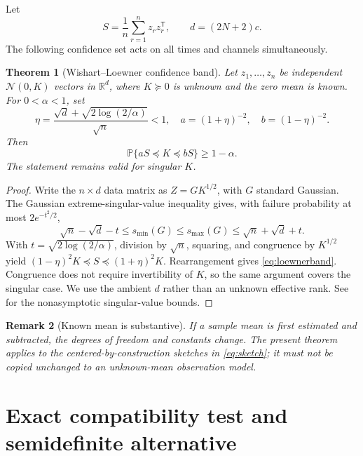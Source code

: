 \documentclass[11pt]{article}
\newtheorem{theorem}{Theorem}
\newtheorem{remark}[theorem]{Remark}
\begin{document}
Let
\begin{equation}
  S=\frac1n\sum_{r=1}^n z_rz_r^{\mathsf T},\qquad
  d=(2N+2)c.
\end{equation}
The following confidence set acts on all times and channels simultaneously.

\begin{theorem}[Wishart--Loewner confidence band]
\label{thm:wishart}
Let $z_1,\ldots,z_n$ be independent $\mathcal N(0,K)$ vectors in
$\mathbb R^d$, where $K\succeq0$ is unknown and the zero mean is known.  For
$0<\alpha<1$, set
\begin{equation}
 \eta=\frac{\sqrt d+\sqrt{2\log(2/\alpha)}}{\sqrt n}<1,
 \quad a=(1+\eta)^{-2},\quad b=(1-\eta)^{-2}.
 \label{eq:bandconstants}
\end{equation}
Then
\begin{equation}
  \mathbb P\{aS\preceq K\preceq bS\}\ge1-\alpha.
  \label{eq:loewnerband}
\end{equation}
The statement remains valid for singular $K$.
\end{theorem}

\begin{proof}
Write the $n\times d$ data matrix as $Z=GK^{1/2}$, with $G$ standard
Gaussian.  The Gaussian extreme-singular-value inequality gives, with failure
probability at most $2e^{-t^2/2}$,
\[
 \sqrt n-\sqrt d-t\le s_{\min}(G)\le s_{\max}(G)
 \le\sqrt n+\sqrt d+t.
\]
With $t=\sqrt{2\log(2/\alpha)}$, division by $\sqrt n$, squaring, and
congruence by $K^{1/2}$ yield
$(1-\eta)^2K\preceq S\preceq(1+\eta)^2K$.  Rearrangement gives
\eqref{eq:loewnerband}.  Congruence does not require invertibility of $K$, so
the same argument covers the singular case.  We use the ambient $d$ rather
than an unknown effective rank.  See~\cite{RudelsonVershynin2010,Vershynin2010}
for the nonasymptotic singular-value bounds.
\end{proof}

\begin{remark}[Known mean is substantive]
If a sample mean is first estimated and subtracted, the degrees of freedom and
constants change.  The present theorem applies to the centered-by-construction
sketches in \eqref{eq:sketch}; it must not be copied unchanged to an unknown-mean
observation model.
\end{remark}

\section{Exact compatibility test and semidefinite alternative}
\end{document}

